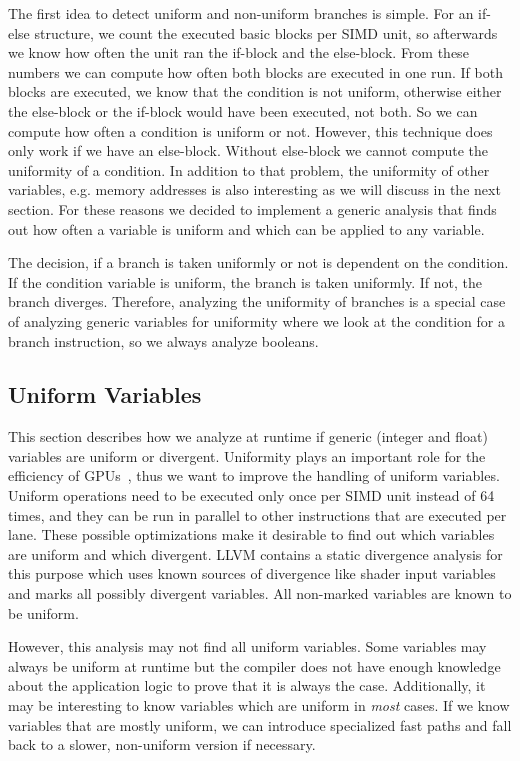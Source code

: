 The first idea to detect uniform and non-uniform branches is simple.
For an if-else structure, we count the executed basic blocks per SIMD unit, so afterwards we know how often the unit ran the if-block and the else-block. From these numbers we can compute how often both blocks are executed in one run.
If both blocks are executed, we know that the condition is not uniform, otherwise either the else-block or the if-block would have been executed, not both. So we can compute how often a condition is uniform or not.
However, this technique does only work if we have an else-block. Without else-block we cannot compute the uniformity of a condition.
In addition to that problem, the uniformity of other variables, e.g. memory addresses is also interesting as we will discuss in the next section.
For these reasons we decided to implement a generic analysis that finds out how often a variable is uniform and which can be applied to any variable.

The decision, if a branch is taken uniformly or not is dependent on the condition.
If the condition variable is uniform, the branch is taken uniformly. If not, the branch diverges.
Therefore, analyzing the uniformity of branches is a special case of analyzing generic variables for uniformity where we look at the condition for a branch instruction, so we always analyze booleans.

\subsection{Uniform Variables}
\label{sub:uniformity}
This section describes how we analyze at runtime if generic (integer and float) variables are uniform or divergent.
Uniformity plays an important role for the efficiency of GPUs~\cite{Chen2016}, thus we want to improve the handling of uniform variables.
Uniform operations need to be executed only once per SIMD unit instead of 64 times, and they can be run in parallel to other instructions that are executed per lane.
These possible optimizations make it desirable to find out which variables are uniform and which divergent.
LLVM contains a static divergence analysis for this purpose which uses known sources of divergence like shader input variables and marks all possibly divergent variables.
All non-marked variables are known to be uniform.

However, this analysis may not find all uniform variables.
Some variables may always be uniform at runtime but the compiler does not have enough knowledge about the application logic to prove that it is always the case.
Additionally, it may be interesting to know variables which are uniform in \emph{most} cases.
If we know variables that are mostly uniform, we can introduce specialized fast paths and fall back to a slower, non-uniform version if necessary.


